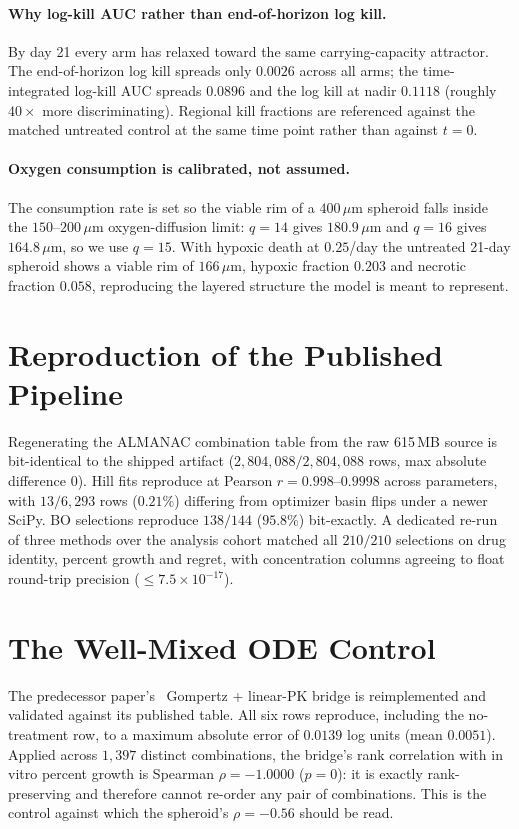 \documentclass{article}
\begin{document}
\paragraph{Why log-kill AUC rather than end-of-horizon log kill.} By day 21
every arm has relaxed toward the same carrying-capacity attractor. The
end-of-horizon log kill spreads only $0.0026$ across all arms; the
time-integrated log-kill AUC spreads $0.0896$ and the log kill at nadir
$0.1118$ (roughly $40\times$ more discriminating). Regional kill fractions
are referenced against the matched untreated control at the same time point
rather than against $t = 0$.

\paragraph{Oxygen consumption is calibrated, not assumed.} The consumption
rate is set so the viable rim of a $400\,\mu$m spheroid falls inside the
$150$--$200\,\mu$m oxygen-diffusion limit: $q = 14$ gives $180.9\,\mu$m and
$q = 16$ gives $164.8\,\mu$m, so we use $q = 15$. With hypoxic death at
$0.25$/day the untreated 21-day spheroid shows a viable rim of $166\,\mu$m,
hypoxic fraction $0.203$ and necrotic fraction $0.058$, reproducing the
layered structure the model is meant to represent.

\section{Reproduction of the Published Pipeline}
\label{app:repro}

Regenerating the ALMANAC combination table from the raw
615\,MB source is bit-identical to the shipped artifact
($2{,}804{,}088/2{,}804{,}088$ rows, max absolute difference $0$). Hill fits
reproduce at Pearson $r = 0.998$--$0.9998$ across parameters, with
$13/6{,}293$ rows ($0.21\%$) differing from optimizer basin flips under a
newer SciPy. BO selections reproduce $138/144$ ($95.8\%$) bit-exactly. A
dedicated re-run of three methods over the analysis cohort matched all
$210/210$ selections on drug identity, percent growth and regret, with
concentration columns agreeing to float round-trip precision
($\le 7.5 \times 10^{-17}$).

\section{The Well-Mixed ODE Control}
\label{app:ode}

The predecessor paper's~\citep{gonehal2026savitar} Gompertz + linear-PK bridge is reimplemented and
validated against its published table. All six rows reproduce, including the
no-treatment row, to a maximum absolute error of $0.0139$ log units (mean
$0.0051$). Applied across $1{,}397$ distinct combinations, the bridge's rank
correlation with in vitro percent growth is Spearman $\rho = -1.0000$
($p = 0$): it is exactly rank-preserving and therefore cannot re-order any
pair of combinations. This is the control against which the spheroid's
$\rho = -0.56$ should be read.
\end{document}
